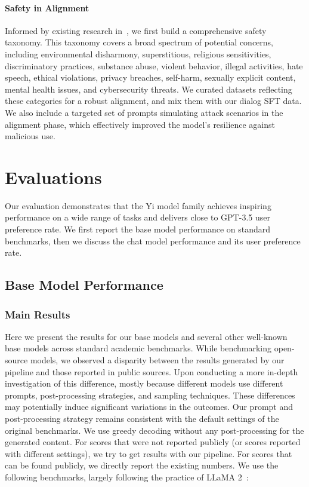 \documentclass[numbers,sort&compress]{article}
\begin{document}
\paragraph{Safety in Alignment}
Informed by existing research in~\citep{glaese2022improving, ji2023beavertails}, we first build a comprehensive safety taxonomy. 
This taxonomy covers a broad spectrum of potential concerns, including environmental disharmony, superstitious, religious sensitivities, discriminatory practices, substance abuse, violent behavior, illegal activities, hate speech, ethical violations, privacy breaches, self-harm, sexually explicit content, mental health issues, and cybersecurity threats. We curated datasets reflecting these categories for a robust alignment, and mix them with our dialog SFT data.
We also include a targeted set of prompts simulating attack scenarios in the alignment phase, which effectively improved the model's resilience against malicious use.

\section{Evaluations}
\label{sec:evaluations}

Our evaluation demonstrates that the Yi model family achieves inspiring performance on a wide range of tasks and delivers close to GPT-3.5 user preference rate. We first report the base model performance on standard benchmarks, then we discuss the chat model performance and its user preference rate. 

\subsection{Base Model Performance}
\subsubsection{Main Results}
\label{sec:main results}

Here we present the results for our base models and several other well-known base models across standard academic benchmarks. While benchmarking open-source models, we observed a disparity between the results generated by our pipeline and those reported in public sources. Upon conducting a more in-depth investigation of this difference, mostly because different models use different prompts, post-processing strategies, and sampling techniques.
These differences may potentially induce significant variations in the outcomes. Our prompt and post-processing strategy remains consistent with the default settings of the original benchmarks\citep{PIQA,siqa,hellaswag,winogrande,arc,obqa,csqa,squad,quac,boolq,cobbe2021training,hendrycks2021measuring,chen2021evaluating,austin2021program,hendrycks2020measuring,li2023cmmlu,zhang2023evaluating,srivastava2023imitation,suzgun2022challenging}.
We use greedy decoding without any post-processing for the generated content. For scores that were not reported publicly (or scores reported with different settings), we try to get results with our pipeline. For scores that can be found publicly, we directly report the existing numbers. We use the following benchmarks, largely following the practice of LLaMA 2~\citep{llama2}:
\end{document}
